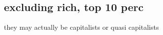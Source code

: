 \documentclass[10pt, letterpaper]{article}
\begin{document}
\begin{spacing}{1.8}


\section{excluding rich, top 10 perc}
they may actually be capitalists or quasi capitalists




\end{spacing}
\end{document}
